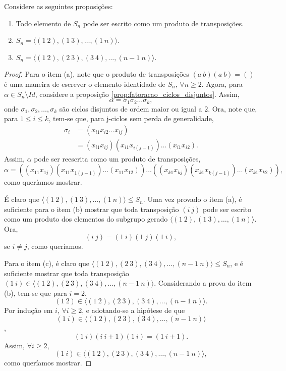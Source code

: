 \documentclass[11pt,openany]{book}
\newcommand{\gen}[1]{\ensuremath{\langle #1\rangle}}
\begin{document}
\begin{proposition}
\label{prop:tres_prop_S_n_transposicoes}
    Considere as seguintes proposições:
    \begin{enumerate}[label=\alph*)]
        \item Todo elemento de $S_n$ pode ser escrito como um produto de transposições.
        \item $S_n = \gen{(1 \ 2), (1 \ 3), \dots, (1 \ n)}$.
        \item $S_n = \gen{(1 \ 2), (2 \ 3), (3 \ 4), \dots, (n-1 \ n)}$.
    \end{enumerate}
\end{proposition}
\begin{proof}
    Para o item (a), note que o produto de transposições $(a \ b) (a \ b) = ()$ é uma maneira de escrever o elemento identidade de $S_n$, $\forall n \geq 2$.
    Agora, para $\alpha \in S_n \setminus Id$, considere a proposição \ref{prop:fatoracao_ciclos_disjuntos}. Assim,
    \[\alpha = \sigma_1 \sigma_2 \dots \sigma_k,\]
    onde $\sigma_1, \sigma_2, \dots, \sigma_k$ são ciclos disjuntos de ordem maior ou igual a $2$.
    Ora, note que, para $1 \leq i \leq k$, tem-se que, para j-ciclos sem perda de generalidade,
    \begin{align*}
        \sigma_i &= (x_{i1} x_{i2} \dots x_{ij}) \\
        &= (x_{i1} x_{ij}) (x_{i1} x_{i(j-1)}) \dots (x_{i1} x_{i2}).
    \end{align*}
    Assim, $\alpha$ pode ser reescrita como um produto de transposições,
    \[\alpha = ((x_{11} x_{1j}) (x_{11} x_{1(j-1)}) \dots (x_{11} x_{12})) \dots ((x_{k1} x_{kj}) (x_{k1} x_{k(j-1)}) \dots (x_{k1} x_{k2})),\]
    como queríamos mostrar.

    É claro que $\gen{(1 \ 2), (1 \ 3), \dots, (1 \ n)} \leq S_n$. Uma vez provado o item (a), é suficiente para o item (b) mostrar que toda transposição $(i \ j)$ pode ser escrito como um produto dos elementos do subgrupo gerado $\gen{(1 \ 2), (1 \ 3), \dots, (1 \ n)}$. Ora,
    \[(i \ j) = (1 \ i) (1 \ j) (1 \ i),\]
    se $i \not= j$, como queríamos.

    Para o item (c), é claro que $\gen{(1 \ 2), (2 \ 3), (3 \ 4), \dots, (n-1 \ n)} \leq S_n$, e é suficiente mostrar que toda transposição $(1 \ i) \in \gen{(1 \ 2), (2 \ 3), (3 \ 4), \dots, (n-1 \ n)}$. Considerando a prova do item (b), tem-se que para $i = 2$,
    \[(1 \ 2) \in \gen{(1 \ 2), (2 \ 3), (3 \ 4), \dots, (n-1 \ n)}.\]
    Por indução em $i$, $\forall i \geq 2$, e adotando-se a hipótese de que $$(1 \ i) \in \gen{(1 \ 2), (2 \ 3), (3 \ 4), \dots, (n-1 \ n)}$$,
    \[(1 \ i) (i \ i+1) (1 \ i) = (1 \ i+1).\]
    Assim, $\forall i \geq 2$,
    \[(1 \ i) \in \gen{(1 \ 2), (2 \ 3), (3 \ 4), \dots, (n-1 \ n)},\]
    como queríamos mostrar.
\end{proof}
\end{document}
